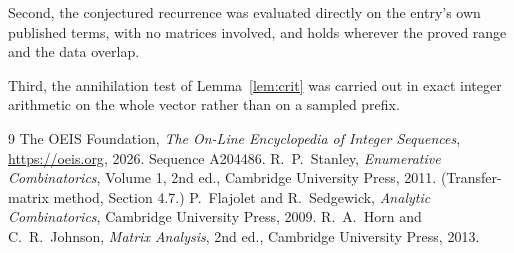 \documentclass[11pt,a4paper]{article}
\theoremstyle{plain}
\theoremstyle{definition}
\begin{document}
Second, the conjectured recurrence was evaluated directly on the entry's own published terms,
with no matrices involved, and holds wherever the proved range and the data overlap.

Third, the annihilation test of Lemma~\ref{lem:crit} was carried out in exact integer
arithmetic on the whole vector rather than on a sampled prefix.

\begin{thebibliography}{9}
 The OEIS Foundation, \emph{The On-Line Encyclopedia of Integer
Sequences}, \url{https://oeis.org}, 2026. Sequence A204486.
 R.~P.~Stanley, \emph{Enumerative Combinatorics}, Volume 1, 2nd ed.,
Cambridge University Press, 2011. (Transfer-matrix method, Section 4.7.)
 P.~Flajolet and R.~Sedgewick, \emph{Analytic Combinatorics}, Cambridge
University Press, 2009.
 R.~A.~Horn and C.~R.~Johnson, \emph{Matrix Analysis}, 2nd ed., Cambridge
University Press, 2013.
\end{thebibliography}
\end{document}
